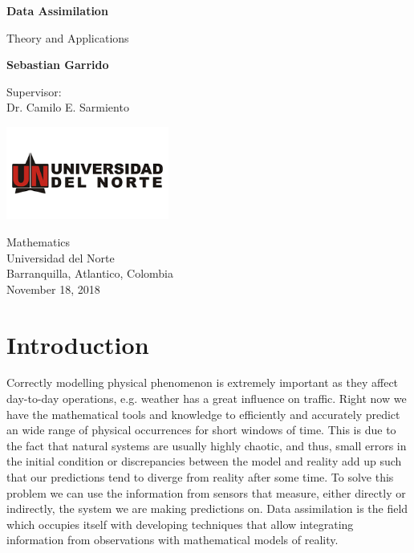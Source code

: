 \documentclass{article}
\begin{document}
\begin{titlepage}
\begin{center}
\vspace*{1cm}

\Huge
\textbf{Data Assimilation}

\vspace{0.5cm}
\LARGE
Theory and Applications

\vspace{1.5cm}

\textbf{Sebastian Garrido}

\vfill

Supervisor: \\
Dr. Camilo E. Sarmiento

\vspace{0.8cm}

\includegraphics[width=0.4\textwidth]{university}

\Large
Mathematics \\
Universidad del Norte \\
Barranquilla, Atlantico, Colombia \\
November 18, 2018

\end{center}
\end{titlepage}

\section{Introduction}
Correctly modelling physical phenomenon is extremely important as they affect day-to-day operations, e.g. weather has a great influence on traffic. Right now we have the mathematical tools and knowledge to efficiently and accurately predict an wide range of physical occurrences for short windows of time. This is due to the fact that natural systems are usually highly chaotic, and thus, small errors in the initial condition or discrepancies between the model and reality add up such that our predictions tend to diverge from reality after some time. To solve this problem we can use the information from sensors that measure, either directly or indirectly, the system we are making predictions on. Data assimilation is the field which occupies itself with developing techniques that allow integrating information from observations with mathematical models of reality. \\
\end{document}
